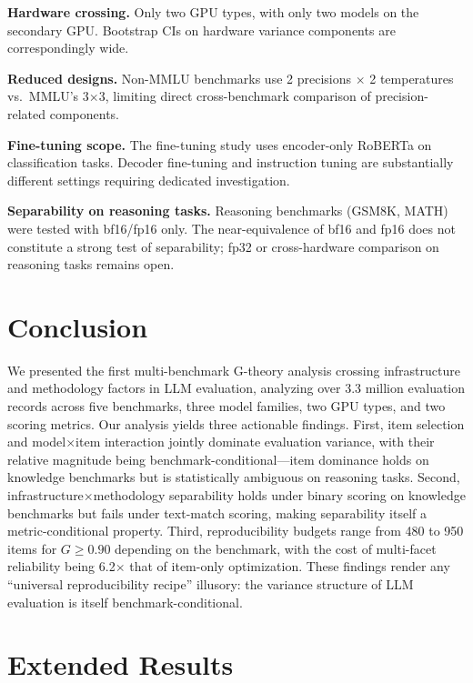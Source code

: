 \documentclass[letterpaper,11pt]{article}
\begin{document}
\textbf{Hardware crossing.}
Only two GPU types, with only two models on the secondary GPU.
Bootstrap CIs on hardware variance components are correspondingly wide.

\textbf{Reduced designs.}
Non-MMLU benchmarks use 2 precisions $\times$ 2 temperatures vs.\ MMLU's 3$\times$3, limiting direct cross-benchmark comparison of precision-related components.

\textbf{Fine-tuning scope.}
The fine-tuning study uses encoder-only RoBERTa on classification tasks.
Decoder fine-tuning and instruction tuning are substantially different settings requiring dedicated investigation.

\textbf{Separability on reasoning tasks.}
Reasoning benchmarks (GSM8K, MATH) were tested with bf16/fp16 only.
The near-equivalence of bf16 and fp16 does not constitute a strong test of separability; fp32 or cross-hardware comparison on reasoning tasks remains open.

\section{Conclusion}

We presented the first multi-benchmark G-theory analysis crossing infrastructure and methodology factors in LLM evaluation, analyzing over 3.3 million evaluation records across five benchmarks, three model families, two GPU types, and two scoring metrics.
Our analysis yields three actionable findings.
First, item selection and model$\times$item interaction jointly dominate evaluation variance, with their relative magnitude being benchmark-conditional---item dominance holds on knowledge benchmarks but is statistically ambiguous on reasoning tasks.
Second, infrastructure$\times$methodology separability holds under binary scoring on knowledge benchmarks but fails under text-match scoring, making separability itself a metric-conditional property.
Third, reproducibility budgets range from 480 to 950 items for $G\geq0.90$ depending on the benchmark, with the cost of multi-facet reliability being 6.2$\times$ that of item-only optimization.
These findings render any ``universal reproducibility recipe'' illusory: the variance structure of LLM evaluation is itself benchmark-conditional.




\appendix

\section{Extended Results}
\end{document}
